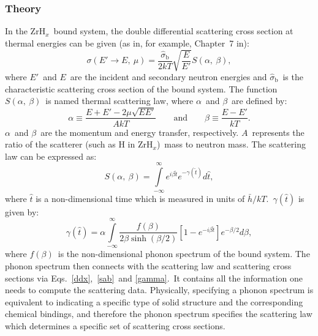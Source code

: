\documentclass[review]{elsarticle}
\newcommand{\zh}{ZrH$_x$}
\newcommand{\ddxcs}{\sigma(E'\to E,~\mu)}
\newcommand{\tcb}[1]{{#1}}
\newcommand{\rc}[2]{(Reviewer#1Comment#2)}
\begin{document}
\subsubsection*{Theory}
In the \zh~bound system, the double differential scattering cross section at thermal energies can be given \tcb{(as in, for example, Chapter\ 7 in\cite{glasstone}):}
\begin{equation}\label{ddx}
\ddxcs=\frac{\hat{\sigma}_\mathrm{b}}{2kT}\sqrt{\frac{E}{E'}}S(\alpha,~\beta),
\end{equation}
where $E'$~and $E$~are the incident and secondary neutron energies and $\hat{\sigma}_\mathrm{b}$~is the characteristic scattering cross section of the bound system. The function $S(\alpha,~\beta)$~is named thermal scattering law, where $\alpha$~and $\beta$~are defined by:
\begin{equation}
\alpha\equiv\frac{E+E'-2\mu\sqrt{EE'}}{AkT}\qquad\mathrm{and}\qquad\beta\equiv\frac{E-E'}{kT}.
\end{equation}
$\alpha$~and $\beta$~are the momentum and energy transfer, respectively. $A$~represents the ratio of the scatterer (such as H in \zh)~mass to neutron mass. The scattering law can be expressed as:
\begin{equation}\label{sab}
S(\alpha,~\beta)=\int\limits_{-\infty}^{\infty}e^{i\beta\hat{t}}e^{-\gamma(\hat{t})}d\hat{t},
\end{equation}
where $\hat{t}$ is a non-dimensional time which is measured in units of $\bar{h}/kT$.~$\gamma(\hat{t})$ is given by:
\begin{equation}\label{gamma}
\gamma(\hat{t})=\alpha\int\limits_{-\infty}^{\infty}\frac{f(\beta)}{2\beta\sinh(\beta/2)}\left[1-e^{-i\beta\hat{t}}\right]e^{-\beta/2}d\beta,
\end{equation}
where $f(\beta)$~is the non-dimensional phonon spectrum of the bound system. The phonon spectrum then connects with the scattering law and scattering cross sections via Eqs.~\eqref{ddx},~\eqref{sab}~and \eqref{gamma}.~It contains all the information one needs to compute the scattering data. {Physically, specifying a phonon spectrum is equivalent to indicating a specific type of solid structure and the corresponding chemical bindings, and therefore the phonon spectrum  specifies the scattering law which determines a specific set of scattering cross sections.}%
\end{document}
